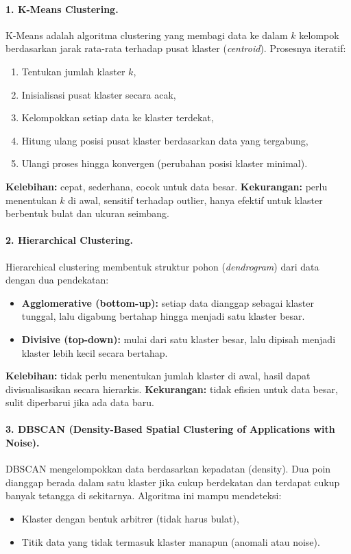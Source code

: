 \paragraph{1. K-Means Clustering.} K-Means adalah algoritma clustering yang membagi data ke dalam \( k \) kelompok berdasarkan jarak rata-rata terhadap pusat klaster (\textit{centroid}). Prosesnya iteratif:
\begin{enumerate}
	\item Tentukan jumlah klaster \( k \),
	\item Inisialisasi pusat klaster secara acak,
	\item Kelompokkan setiap data ke klaster terdekat,
	\item Hitung ulang posisi pusat klaster berdasarkan data yang tergabung,
	\item Ulangi proses hingga konvergen (perubahan posisi klaster minimal).
\end{enumerate}

\textbf{Kelebihan:} cepat, sederhana, cocok untuk data besar.  
\textbf{Kekurangan:} perlu menentukan \( k \) di awal, sensitif terhadap outlier, hanya efektif untuk klaster berbentuk bulat dan ukuran seimbang.

\paragraph{2. Hierarchical Clustering.} Hierarchical clustering membentuk struktur pohon (\textit{dendrogram}) dari data dengan dua pendekatan:
\begin{itemize}
	\item \textbf{Agglomerative (bottom-up):} setiap data dianggap sebagai klaster tunggal, lalu digabung bertahap hingga menjadi satu klaster besar.
	\item \textbf{Divisive (top-down):} mulai dari satu klaster besar, lalu dipisah menjadi klaster lebih kecil secara bertahap.
\end{itemize}

\textbf{Kelebihan:} tidak perlu menentukan jumlah klaster di awal, hasil dapat divisualisasikan secara hierarkis.  
\textbf{Kekurangan:} tidak efisien untuk data besar, sulit diperbarui jika ada data baru.

\paragraph{3. DBSCAN (Density-Based Spatial Clustering of Applications with Noise).} DBSCAN mengelompokkan data berdasarkan kepadatan (density). Dua poin dianggap berada dalam satu klaster jika cukup berdekatan dan terdapat cukup banyak tetangga di sekitarnya. Algoritma ini mampu mendeteksi:
\begin{itemize}
	\item Klaster dengan bentuk arbitrer (tidak harus bulat),
	\item Titik data yang tidak termasuk klaster manapun (anomali atau noise).
\end{itemize}

